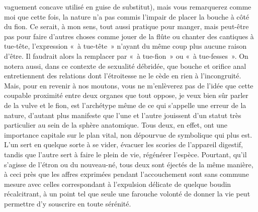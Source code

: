 vaguement concave utilisé en guise de substitut), mais vous remarquerez comme moi que cette fois, la nature n’a pas commis l’impair de placer la bouche à côté du fion. Ce serait, à mon sens, tout aussi pratique pour manger, mais peut-être pas pour faire d’autres choses comme jouer de la flûte ou chanter des cantiques à tue-tête, l’expression «~à tue-tête~» n’ayant du même coup plus aucune raison d’être. Il faudrait alors la remplacer par «~à tue-fion~» ou «~à tue-fesses~». On notera aussi, dans ce contexte de sexualité débridée, que bouche et orifice anal entretiennent des relations dont l’étroitesse ne le cède en rien à l’incongruité. Mais, pour en revenir à nos moutons, vous ne m’enlèverez pas de l’idée que cette coupable proximité entre deux organes que tout oppose, je veux bien sûr parler de la vulve et le fion, est l’archétype même de ce qui s’appelle une erreur de la nature, d’autant plus manifeste que l’une et l’autre jouissent d’un statut très particulier au sein de la sphère anatomique. Tous deux, en effet, ont une importance capitale sur le plan vital, non dépourvue de symbolique qui plus est. L’un sert en quelque sorte à se vider, évacuer les scories de l’appareil digestif, tandis que l’autre sert à faire le plein de vie, régénérer l’espèce. Pourtant, qu’il s’agisse de l’étron ou du nouveau-né, tous deux sont éjectés de la même manière, à ceci près que les affres exprimées pendant l’accouchement sont sans commune mesure avec celles correspondant à l’expulsion délicate de quelque boudin récalcitrant, à un point tel que seule une farouche volonté de donner la vie peut permettre d’y souscrire en toute sérénité.


